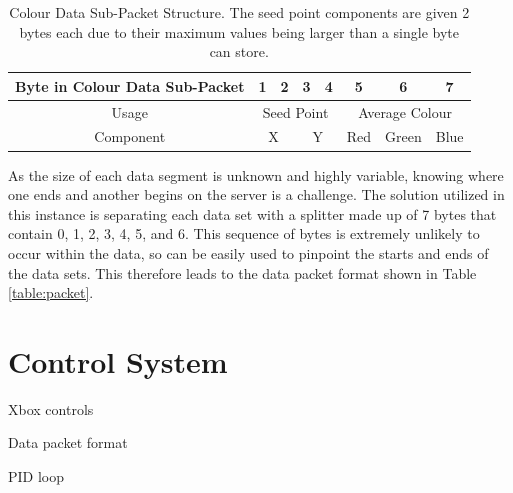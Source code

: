 \begin{table}[H]
\centering
\caption{Colour Data Sub-Packet Structure. The seed point components are given 2 bytes each due to their maximum values being larger than a single byte can store.}
\label{table:colour}
\begin{tabular}{|c|c|c|c|c|c|c|c|}
\hline
Byte in Colour Data Sub-Packet & 1          & 2         & 3          & 4         & 5         & 6           & 7         \\ \hline
Usage                          & \multicolumn{4}{c|}{Seed Point}                 & \multicolumn{3}{c|}{Average Colour} \\ \hline
Component                      & \multicolumn{2}{c|}{X} & \multicolumn{2}{c|}{Y} & Red       & Green       & Blue      \\ \hline
\end{tabular}
\end{table}

As the size of each data segment is unknown and highly variable, knowing where one ends and another begins on the server is a challenge. The solution utilized in this instance is separating each data set with a splitter made up of 7 bytes that contain 0, 1, 2, 3, 4, 5, and 6. This sequence of bytes is extremely unlikely to occur within the data, so can be easily used to pinpoint the starts and ends of the data sets. This therefore leads to the data packet format shown in Table \ref{table:packet}.

\begin{table}[H]
\centering
\caption{Data Packet Format.}
\label{table:packet}
\end{table}

\section{Control System}

Xbox controls

Data packet format

PID loop